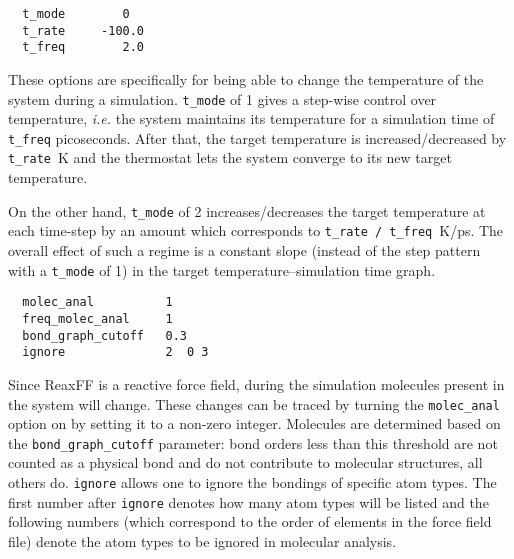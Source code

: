\documentclass{article}
\begin{document}
\begin{verbatim}
  t_mode        0
  t_rate     -100.0
  t_freq        2.0
\end{verbatim}
These options  are specifically for being able to change the temperature of 
the system during a simulation. {\tt t\_mode} of 1 gives a step-wise 
control over temperature, \emph{i.e.} the system maintains its temperature
for a simulation time of {\tt t\_freq} picoseconds. After that, the 
target temperature is increased/decreased by {\tt t\_rate}~K and the 
thermostat lets the system converge to its new target temperature.

On the other hand, {\tt t\_mode} of 2 increases/decreases the target 
temperature at each time-step by an amount which corresponds to 
{\tt t\_rate / t\_freq}~K/ps. The overall effect of such a regime is a 
constant slope (instead of the step pattern with a {\tt t\_mode} of 1) 
in the target temperature--simulation time graph.

\begin{verbatim}
  molec_anal          1
  freq_molec_anal     1
  bond_graph_cutoff   0.3
  ignore              2  0 3
\end{verbatim}
Since ReaxFF is a reactive force field, during the simulation molecules 
present in the system will change. These changes can  be traced by turning 
the {\tt molec\_anal} option on by setting it to a non-zero integer. 
Molecules are determined based on the {\tt bond\_graph\_cutoff} parameter: 
bond orders less than this threshold are not counted as a physical
bond and do not contribute to molecular structures, all others do. 
{\tt ignore} allows one to ignore the bondings of specific atom types. 
The first number after {\tt ignore} denotes how many atom types will be 
listed and the following numbers (which correspond to the order of 
elements in the force field file) denote the atom types to be ignored 
in molecular analysis.




\end{document}
